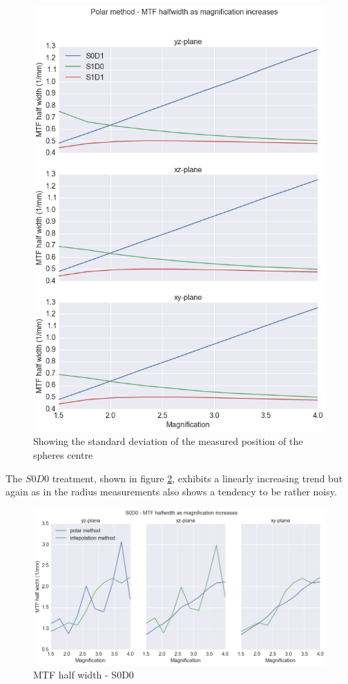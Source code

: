 \documentclass[
  twoside,
  11pt, a4paper,
  footinclude=true,
  headinclude=true,
  cleardoublepage=empty
]{scrbook}
\begin{document}
\begin{figure}[h!]
  \centering
    \includegraphics[width=\textwidth]{figures/polarmtf.png}
    \caption{Showing the standard deviation of the measured position of the spheres centre}
        \label{polarmtf}
\end{figure}

The $S0D0$ treatment, shown in figure \ref{S0D0half}, exhibits a linearly increasing trend but again as in the radius measurements also shows a tendency to be rather noisy.

\begin{figure}[h!]
  \centering
    \includegraphics[width=\textwidth]{code/MTF_and_PSF/MTF_Interp_Polar_Plots_files/MTF_Interp_Polar_Plots_5_1.png}
    \caption{MTF half width - S0D0}
        \label{S0D0half}
\end{figure}
\end{document}
